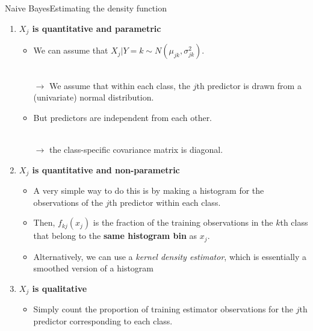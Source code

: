 \begin{frame}{Naive Bayes}{Estimating the density function}

\begin{enumerate}
    \item \textbf{$X_j$ is quantitative and parametric} \pause

    \begin{itemize}
        \item We can assume that $X_j | Y=k \sim N(\mu_{jk}, \sigma_{jk}^2).$ \pause 

        \\ $\rightarrow$ We assume that within each class, the $j$th predictor is drawn from a (univariate) normal distribution. \pause 

        \item But predictors are independent from each other. \pause  
        
        \\ $\rightarrow$ the class-specific covariance matrix is diagonal. \pause 
     \end{itemize}

    \item \textbf{$X_j$ is quantitative and non-parametric} \pause 

    \begin{itemize}
        \item A very simple way to do this is by making a histogram for the observations of the $j$th predictor within each class. \pause 
        \item Then, $f_{kj}(x_j)$ is the fraction of the training observations in the $k$th class that belong to the \textbf{same histogram bin} as $x_j$. \pause 
        \item Alternatively, we can use a \textit{kernel density estimator}, which is essentially a smoothed version of a histogram
    \end{itemize}

    \item \textbf{$X_j$ is qualitative}  \pause 
    \begin{itemize}
        \item Simply count the proportion of training  estimator observations for the $j$th predictor corresponding to each class. 
    \end{itemize}
    
\end{enumerate}


\end{frame}


